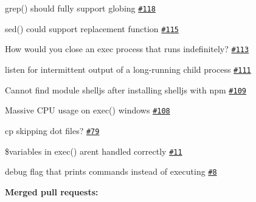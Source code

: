 \begin{DoxyItemize}
\item grep() should fully support globing \href{https://github.com/shelljs/shelljs/issues/118}{\tt \#118}
\item sed() could support replacement function \href{https://github.com/shelljs/shelljs/issues/115}{\tt \#115}
\item How would you close an exec process that runs indefinitely? \href{https://github.com/shelljs/shelljs/issues/113}{\tt \#113}
\item listen for intermittent output of a long-\/running child process \href{https://github.com/shelljs/shelljs/issues/111}{\tt \#111}
\item Cannot find module \textquotesingle{}shelljs\textquotesingle{} after installing shelljs with npm \href{https://github.com/shelljs/shelljs/issues/109}{\tt \#109}
\item Massive C\+PU usage on exec() windows \href{https://github.com/shelljs/shelljs/issues/108}{\tt \#108}
\item cp skipping dot files? \href{https://github.com/shelljs/shelljs/issues/79}{\tt \#79}
\item \$variables in exec() aren\textquotesingle{}t handled correctly \href{https://github.com/shelljs/shelljs/issues/11}{\tt \#11}
\item debug flag that prints commands instead of executing \href{https://github.com/shelljs/shelljs/issues/8}{\tt \#8}
\end{DoxyItemize}

{\bfseries Merged pull requests\+:}



